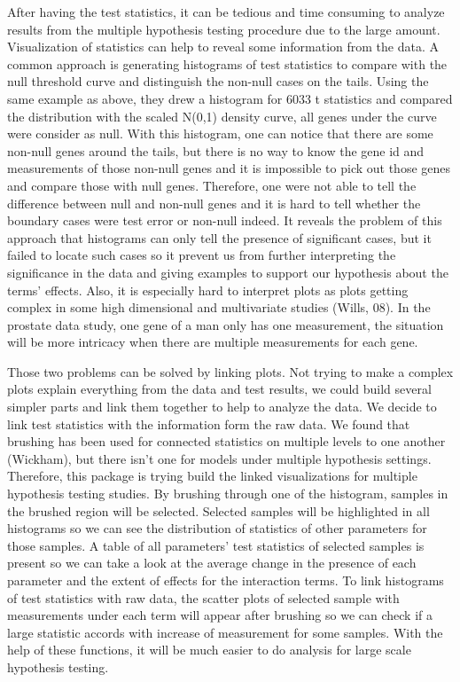 \documentclass[
]{article}
\begin{document}
After having the test statistics, it can be tedious and time consuming
to analyze results from the multiple hypothesis testing procedure due to
the large amount. Visualization of statistics can help to reveal some
information from the data. A common approach is generating histograms of
test statistics to compare with the null threshold curve and distinguish
the non-null cases on the tails. Using the same example as above, they
drew a histogram for 6033 t statistics and compared the distribution
with the scaled N(0,1) density curve, all genes under the curve were
consider as null. With this histogram, one can notice that there are
some non-null genes around the tails, but there is no way to know the
gene id and measurements of those non-null genes and it is impossible to
pick out those genes and compare those with null genes. Therefore, one
were not able to tell the difference between null and non-null genes and
it is hard to tell whether the boundary cases were test error or
non-null indeed. It reveals the problem of this approach that histograms
can only tell the presence of significant cases, but it failed to locate
such cases so it prevent us from further interpreting the significance
in the data and giving examples to support our hypothesis about the
terms' effects. Also, it is especially hard to interpret plots as plots
getting complex in some high dimensional and multivariate studies
(Wills, 08). In the prostate data study, one gene of a man only has one
measurement, the situation will be more intricacy when there are
multiple measurements for each gene.

Those two problems can be solved by linking plots. Not trying to make a
complex plots explain everything from the data and test results, we
could build several simpler parts and link them together to help to
analyze the data. We decide to link test statistics with the information
form the raw data. We found that brushing has been used for connected
statistics on multiple levels to one another (Wickham), but there isn't
one for models under multiple hypothesis settings. Therefore, this
package is trying build the linked visualizations for multiple
hypothesis testing studies. By brushing through one of the histogram,
samples in the brushed region will be selected. Selected samples will be
highlighted in all histograms so we can see the distribution of
statistics of other parameters for those samples. A table of all
parameters' test statistics of selected samples is present so we can
take a look at the average change in the presence of each parameter and
the extent of effects for the interaction terms. To link histograms of
test statistics with raw data, the scatter plots of selected sample with
measurements under each term will appear after brushing so we can check
if a large statistic accords with increase of measurement for some
samples. With the help of these functions, it will be much easier to do
analysis for large scale hypothesis testing.
\end{document}
